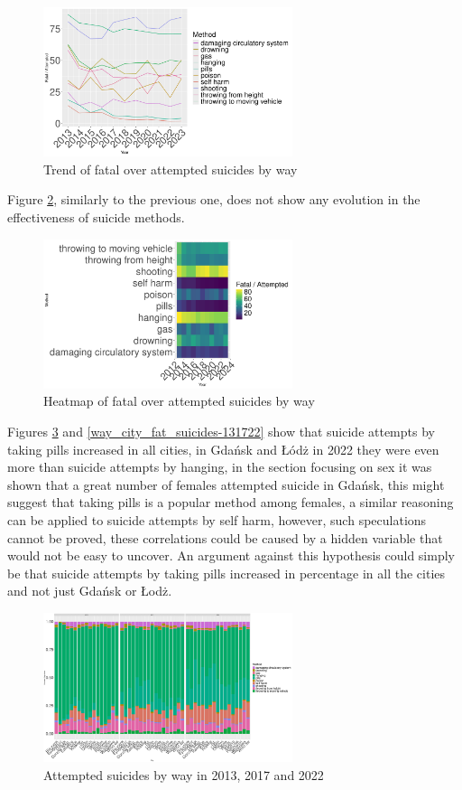 \documentclass{article}
\begin{document}
\begin{figure}[H]
    \centering
    \includegraphics[width=0.65\textwidth]{imgs/way_foa.pdf}
    \caption{Trend of fatal over attempted suicides by way }
    \label{way_foa}
\end{figure}
Figure \ref{way_foa_heat}, similarly to the previous one, does not show any
evolution in the effectiveness of suicide methods.
\begin{figure}[H]
    \centering
    \includegraphics[width=0.65\textwidth]{imgs/way_foa_heat.pdf}
    \caption{Heatmap of fatal over attempted suicides by way }
    \label{way_foa_heat}
\end{figure}
Figures \ref{way_city_att_suicides-131722} and \ref{way_city_fat_suicides-131722}  
show that suicide attempts by taking pills increased in all cities,
in Gdańsk and Łódż in 2022 they were even more than suicide attempts by hanging,
in the section focusing on sex it was shown that a great number of females 
attempted suicide in Gdańsk, this might suggest that taking pills is a popular
method among females, a similar reasoning can be applied to suicide attempts by self harm,
however, such speculations cannot be proved, these correlations could be caused 
by a hidden variable that would not be easy to uncover.
An argument against this hypothesis could simply be that suicide attempts by taking 
pills increased in percentage in all the cities and not just Gdańsk or Łodż.
\begin{figure}[H]
    \centering
    \includegraphics[width=0.65\textwidth]{imgs/way_city_att_suicides-131722.pdf}
    \caption{Attempted suicides by way  in 2013, 2017 and 2022}
    \label{way_city_att_suicides-131722}
\end{figure}
\end{document}
